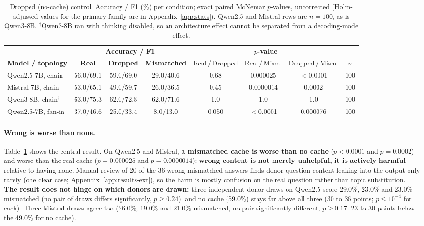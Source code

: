 \documentclass[11pt]{article}
\begin{document}
\begin{table}[t]
\centering
\small
\caption{Dropped (no-cache) control. Accuracy / F1 (\%) per condition; exact
paired McNemar $p$-values, uncorrected (Holm-adjusted values for the
primary family are in Appendix~\ref{app:stats}). Qwen2.5 and Mistral rows are
$n{=}100$, as is Qwen3-8B. $^\dagger$Qwen3-8B ran with thinking disabled, so an
architecture effect cannot be separated from a decoding-mode effect.}
\label{tab:no_relay}
\begin{tabular}{lccccccc}
\toprule
 & \multicolumn{3}{c}{\textbf{Accuracy / F1}} & \multicolumn{3}{c}{\textbf{$p$-value}} & \\
\cmidrule(lr){2-4}\cmidrule(lr){5-7}
\textbf{Model / topology} & \textcolor{realblue}{\textbf{Real}} & \textbf{Dropped} & \textcolor{wrongred}{\textbf{Mismatched}} & Real\,/\,Dropped & Real\,/\,Mism. & Dropped\,/\,Mism. & $n$ \\
\midrule
Qwen2.5-7B, chain        & 56.0/69.1 & 59.0/69.0 & 29.0/40.6 & 0.68  & 0.000025 & $<$0.0001 & 100 \\
Mistral-7B, chain        & 53.0/65.1 & 49.0/59.7 & 26.0/36.5 & 0.45  & 0.0000014 & 0.0002   & 100 \\
Qwen3-8B, chain$^\dagger$& 63.0/75.3 & 62.0/72.8 & 62.0/71.6 & 1.0   & 1.0      & 1.0       & 100 \\
\midrule
Qwen2.5-7B, fan-in       & 37.0/46.6 & 25.0/33.4 & 8.0/13.0  & 0.050 & $<$0.0001 & 0.000076 & 100 \\
\bottomrule
\end{tabular}
\end{table}

\paragraph{Wrong is worse than none.} Table~\ref{tab:no_relay} shows the
central result. On Qwen2.5 and Mistral, \textbf{a mismatched cache is worse than
no cache} ($p<0.0001$ and $p=0.0002$) and worse than the real cache
($p=0.000025$ and $p=0.0000014$): \textbf{wrong content is not merely unhelpful,
it is actively harmful} relative to having none. Manual review of 20 of the
36 wrong mismatched answers finds donor-question content leaking into the
output only rarely (one clear case; Appendix~\ref{app:results-ext}), so
the harm is mostly confusion on the real question rather than topic
substitution. \textbf{The result does not hinge on which donors are drawn:} three
independent donor draws on Qwen2.5 score 29.0\%, 23.0\% and 23.0\% mismatched (no
pair of draws differs significantly, $p\ge0.24$), and no cache (59.0\%) stays far
above all three (30 to 36 points; $p\le10^{-4}$ for each). Three Mistral draws
agree too (26.0\%, 19.0\% and 21.0\% mismatched, no pair significantly different,
$p\ge0.17$; 23 to 30 points below the 49.0\% for no cache).
\end{document}
